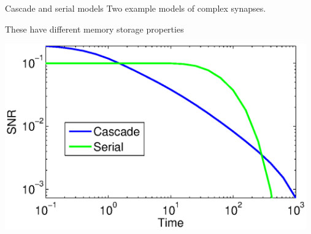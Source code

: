 \documentclass[final,hyperref={pdfpagelabels=false,bookmarks=false}]{beamer}
\begin{document}
\begin{frame}{}
\begin{columns}[t]
\begin{column}{0.27\linewidth}
\begin{block}{Cascade and serial models}
%
 Two example models of complex synapses.
 \begin{center}
  \hspace{2cm}
 \end{center}

 These have different memory storage properties
 \begin{center}
 \includegraphics[width=13cm]{cascms.eps}
 \end{center}
%
\end{block}




\end{column}
\end{columns}
\end{frame}
\end{document}
